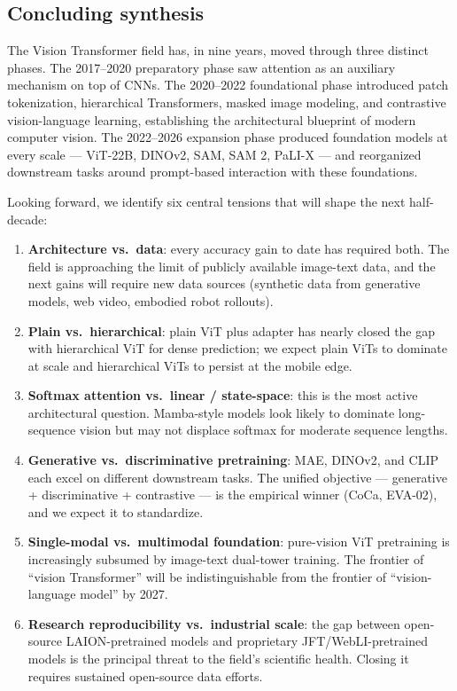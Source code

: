 \subsection{Concluding synthesis}\label{concluding-synthesis}

The Vision Transformer field has, in nine years, moved through three distinct phases. The 2017--2020 preparatory phase saw attention as an auxiliary mechanism on top of CNNs. The 2020--2022 foundational phase introduced patch tokenization, hierarchical Transformers, masked image modeling, and contrastive vision-language learning, establishing the architectural blueprint of modern computer vision. The 2022--2026 expansion phase produced foundation models at every scale --- ViT-22B, DINOv2, SAM, SAM 2, PaLI-X --- and reorganized downstream tasks around prompt-based interaction with these foundations.

Looking forward, we identify six central tensions that will shape the next half-decade:

\begin{enumerate}
\def\labelenumi{\arabic{enumi}.}
\item
  \textbf{Architecture vs.~data}: every accuracy gain to date has required both. The field is approaching the limit of publicly available image-text data, and the next gains will require new data sources (synthetic data from generative models, web video, embodied robot rollouts).
\item
  \textbf{Plain vs.~hierarchical}: plain ViT plus adapter has nearly closed the gap with hierarchical ViT for dense prediction; we expect plain ViTs to dominate at scale and hierarchical ViTs to persist at the mobile edge.
\item
  \textbf{Softmax attention vs.~linear / state-space}: this is the most active architectural question. Mamba-style models look likely to dominate long-sequence vision but may not displace softmax for moderate sequence lengths.
\item
  \textbf{Generative vs.~discriminative pretraining}: MAE, DINOv2, and CLIP each excel on different downstream tasks. The unified objective --- generative + discriminative + contrastive --- is the empirical winner (CoCa, EVA-02), and we expect it to standardize.
\item
  \textbf{Single-modal vs.~multimodal foundation}: pure-vision ViT pretraining is increasingly subsumed by image-text dual-tower training. The frontier of ``vision Transformer'' will be indistinguishable from the frontier of ``vision-language model'' by 2027.
\item
  \textbf{Research reproducibility vs.~industrial scale}: the gap between open-source LAION-pretrained models and proprietary JFT/WebLI-pretrained models is the principal threat to the field's scientific health. Closing it requires sustained open-source data efforts.
\end{enumerate}

